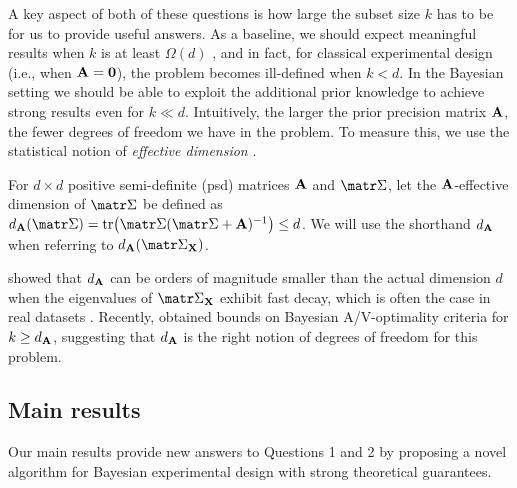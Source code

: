 \documentclass[../../thesis.tex]{subfiles}
\begin{document}
A key aspect of both of these questions is how large the subset
size $k$ has to be for us to provide useful answers. As a baseline, we
should expect meaningful results when $k$ is at least $\Omega(d)$ \citep[see
  discussion in][]{near-optimal-design}, and in fact,
for classical experimental design (i.e., when $\mathbf A=\mathbf 0$), the problem
becomes ill-defined
when $k<d$. In the Bayesian setting we should be able to exploit the
additional prior knowledge
to achieve strong results even for $k\ll d$. Intuitively, the larger
the prior precision matrix $\mathbf A$, the fewer degrees of freedom we have
in the problem. To measure this, we use the statistical notion of
\emph{effective dimension} \citep{ridge-leverage-scores}.
\begin{definition}
  For $d\times d$ positive semi-definite (psd) matrices $\mathbf A$ and $\Sigmab$,
  let the $\mathbf A$-effective dimension of $\Sigmab$
  be defined as $d_{\A}(\Sigmab) =
    \tr\big(\Sigmab(\Sigmab+\A)^{-1}\big) \leq d$.
  We will use the shorthand $d_{\mathbf A}$ when referring to $d_{\A}(\Sigmab_{\X})$.
\end{definition}
\cite{klivans-goel17} showed that $d_\mathbf A$ can be orders of
magnitude smaller than the
actual dimension $d$ when the eigenvalues of $\Sigmab_\X$ exhibit fast
decay, which is often the case in real datasets
\citep{revisiting-nystrom}. Recently,
\cite{regularized-volume-sampling} obtained bounds on Bayesian
A/V-optimality criteria for $k\geq d_{\mathbf A}$, suggesting that $d_{\mathbf A}$
is the right notion of degrees of freedom for this problem.

\subsection{Main results}
Our main results provide new answers to Questions 1 and 2
by proposing a novel algorithm for Bayesian experimental design with
strong theoretical guarantees.
\end{document}
